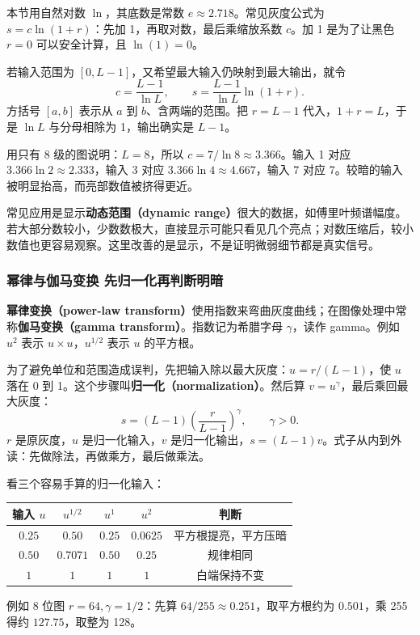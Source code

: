 本节用自然对数 $\ln$，其底数是常数 $e\approx2.718$。常见灰度公式为 $s=c\ln(1+r)$：先加 1，再取对数，最后乘缩放系数 $c$。加 1 是为了让黑色 $r=0$ 可以安全计算，且 $\ln(1)=0$。

若输入范围为 $[0,L-1]$，又希望最大输入仍映射到最大输出，就令
\[
c=\frac{L-1}{\ln L},\qquad
s=\frac{L-1}{\ln L}\ln(1+r).
\]
方括号 $[a,b]$ 表示从 $a$ 到 $b$、含两端的范围。把 $r=L-1$ 代入，$1+r=L$，于是 $\ln L$ 与分母相除为 1，输出确实是 $L-1$。

用只有 8 级的图说明：$L=8$，所以 $c=7/\ln8\approx3.366$。输入 1 对应 $3.366\ln2\approx2.333$，输入 3 对应 $3.366\ln4\approx4.667$，输入 7 对应 7。较暗的输入被明显抬高，而亮部数值被挤得更近。

常见应用是显示\textbf{动态范围（dynamic range）}很大的数据，如傅里叶频谱幅度。若大部分数较小，少数数极大，直接显示可能只看见几个亮点；对数压缩后，较小数值也更容易观察。这里改善的是显示，不是证明微弱细节都是真实信号。

\subsubsection*{幂律与伽马变换 先归一化再判断明暗}

\textbf{幂律变换（power-law transform）}使用指数来弯曲灰度曲线；在图像处理中常称\textbf{伽马变换（gamma transform）}。指数记为希腊字母 $\gamma$，读作 gamma。例如 $u^2$ 表示 $u\times u$，$u^{1/2}$ 表示 $u$ 的平方根。

为了避免单位和范围造成误判，先把输入除以最大灰度：$u=r/(L-1)$，使 $u$ 落在 0 到 1。这个步骤叫\textbf{归一化（normalization）}。然后算 $v=u^\gamma$，最后乘回最大灰度：
\[
s=(L-1)\left(\frac{r}{L-1}\right)^\gamma,\qquad \gamma>0.
\]
$r$ 是原灰度，$u$ 是归一化输入，$v$ 是归一化输出，$s=(L-1)v$。式子从内到外读：先做除法，再做乘方，最后做乘法。

看三个容易手算的归一化输入：
\begin{center}
\begin{tabular}{ccccc}
\toprule
输入 $u$ & $u^{1/2}$ & $u^1$ & $u^2$ & 判断 \\
\midrule
$0.25$ & $0.50$ & $0.25$ & $0.0625$ & 平方根提亮，平方压暗 \\
$0.50$ & $0.7071$ & $0.50$ & $0.25$ & 规律相同 \\
$1$ & $1$ & $1$ & $1$ & 白端保持不变 \\
\bottomrule
\end{tabular}
\end{center}
例如 8 位图 $r=64,\gamma=1/2$：先算 $64/255\approx0.251$，取平方根约为 $0.501$，乘 255 得约 $127.75$，取整为 128。

